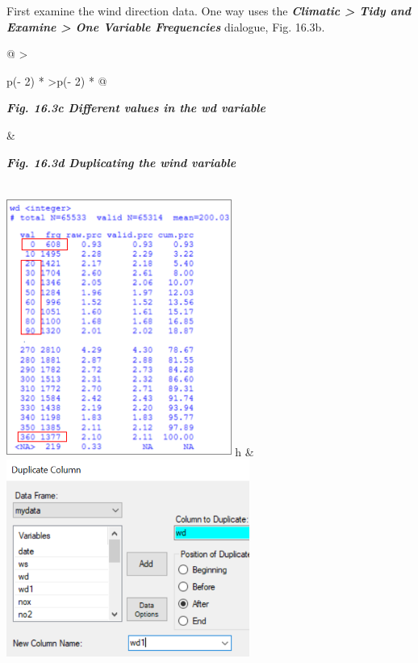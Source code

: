 \documentclass[
  letterpaper,
  DIV=11,
  numbers=noendperiod]{scrreprt}
\begin{document}
First examine the wind direction data. One way uses the
\textbf{\emph{Climatic \textgreater{} Tidy and Examine \textgreater{}
One Variable Frequencies}} dialogue, Fig. 16.3b.

\begin{longtable}[]{@{}
  >{\raggedright\arraybackslash}p{(\columnwidth - 2\tabcolsep) * }
  >{\raggedleft\arraybackslash}p{(\columnwidth - 2\tabcolsep) * }@{}}
\toprule\noalign{}
\begin{minipage}[b]{\linewidth}\raggedright
\textbf{\emph{Fig. 16.3c Different values in the wd variable}}
\end{minipage} & \begin{minipage}[b]{\linewidth}\raggedleft
\textbf{\emph{Fig. 16.3d Duplicating the wind variable}}
\end{minipage} \\
\midrule\noalign{}
\endhead
\bottomrule\noalign{}
\endlastfoot
\includegraphics[width=2.90208in,height=3.33472in]{figures/Fig16.3c.png}
h &
\includegraphics[width=3.1402in,height=\textheight]{figures/Fig16.3d.png} \\
\end{longtable}
\end{document}
